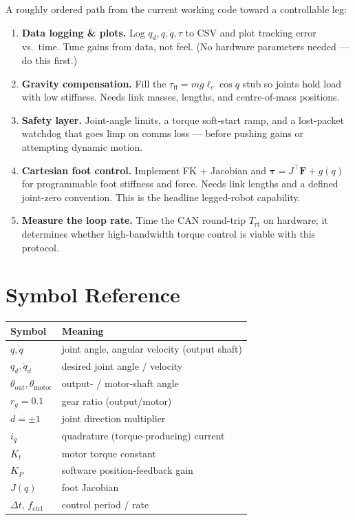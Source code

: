 \documentclass[11pt,a4paper]{article}
\begin{document}
A roughly ordered path from the current working code toward a controllable leg:
\begin{enumerate}[nosep]
  \item \textbf{Data logging \& plots.} Log $q_d,q,\dot q,\tau$ to CSV and plot
        tracking error vs.\ time. Tune gains from data, not feel. (No hardware
        parameters needed --- do this first.)
  \item \textbf{Gravity compensation.} Fill the $\tau_{\text{ff}}=m g \ell_c\cos q$
        stub so joints hold load with low stiffness. Needs link masses, lengths,
        and centre-of-mass positions.
  \item \textbf{Safety layer.} Joint-angle limits, a torque soft-start ramp, and
        a lost-packet watchdog that goes limp on comms loss --- before pushing
        gains or attempting dynamic motion.
  \item \textbf{Cartesian foot control.} Implement FK + Jacobian and
        $\boldsymbol\tau = J^\top\mathbf F + g(q)$ for programmable foot
        stiffness and force. Needs link lengths and a defined joint-zero
        convention. This is the headline legged-robot capability.
  \item \textbf{Measure the loop rate.} Time the CAN round-trip $T_{\text{rt}}$ on
        hardware; it determines whether high-bandwidth torque control is viable
        with this protocol.
\end{enumerate}

\appendix
\section{Symbol Reference}
\begin{center}
\begin{tabular}{@{}ll@{}}
\toprule
\textbf{Symbol} & \textbf{Meaning} \\
\midrule
$q,\dot q$              & joint angle, angular velocity (output shaft) \\
$q_d,\dot q_d$          & desired joint angle / velocity \\
$\theta_{\text{out}},\theta_{\text{motor}}$ & output- / motor-shaft angle \\
$r_g=0.1$              & gear ratio (output/motor) \\
$d=\pm1$               & joint direction multiplier \\
$i_q$                  & quadrature (torque-producing) current \\
$K_t$                  & motor torque constant \\
$K_P$                  & software position-feedback gain \\
$J(q)$                 & foot Jacobian \\
$\Delta t,\,f_{\text{ctrl}}$ & control period / rate \\
\bottomrule
\end{tabular}
\end{center}
\end{document}
